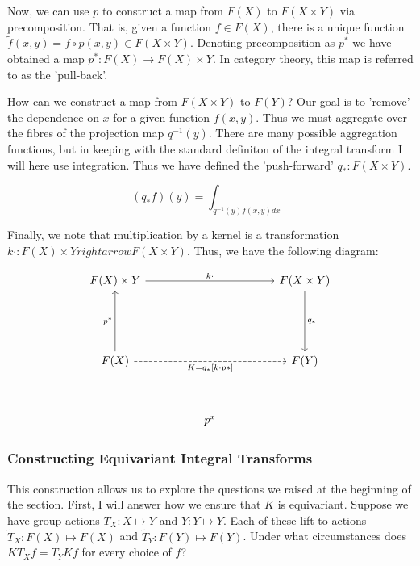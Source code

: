 \documentclass[12pt]{article}
\begin{document}
Now, we can use $p$ to construct a map from $F(X)$ to $F(X\times Y)$ via precomposition. That is, given a function $f \in F(X)$, there is a unique function $\tilde{f}(x,y) = f \circ p (x, y)  \in F(X \times Y)$. Denoting precomposition as $p^*$ we have obtained a map $p^*: F(X) \rightarrow F(X) \times Y$. In category theory, this map is referred to as the 'pull-back'.

How can we construct a map from $F(X \times Y)$ to $F(Y)$? Our goal is to 'remove' the dependence on $x$ for a given function $f(x, y)$. Thus we must aggregate over the fibres of the projection map $q^{-1}(y)$. There are many possible aggregation functions, but in keeping with the standard definiton of the integral transform I will here use integration. Thus we have defined the 'push-forward' $q_* : F(X \times Y)$.

$$ (q_* f)(y) = \int_{q^{-1}(y) f(x, y) dx} $$

Finally, we note that multiplication by a kernel is a transformation $k\cdot : F(X) \times Y rightarrow F(X \times Y)$. Thus, we have the following diagram:

\[\begin{tikzcd}
	{F(X) \times Y} &&&& {F(X \times Y)} \\
	\\
	\\
	{F(X)} &&&& {F(Y)} \\
	\\
	&& {p^x}
	\arrow["{K = q_*[k \cdot p*]}"', dashed, from=4-1, to=4-5]
	\arrow["{p^*}", from=4-1, to=1-1]
	\arrow["{k\cdot }", from=1-1, to=1-5]
	\arrow["{q_*}", from=1-5, to=4-5]
\end{tikzcd}\]

\subsubsection*{Constructing Equivariant Integral Transforms}

This construction allows us to explore the questions we raised at the beginning of the section. First, I will answer how we ensure that $K$ is equivariant. Suppose we have group actions $T_X: X \mapsto Y$ and $Y: Y \mapsto Y$. Each of these lift to actions $\tilde{T}_X: F(X) \mapsto F(X)$ and $\tilde{T}_Y: F(Y) \mapsto F(Y)$. Under what circumstances does $K T_X f = T_Y K f$ for every choice of $f$?
\end{document}
